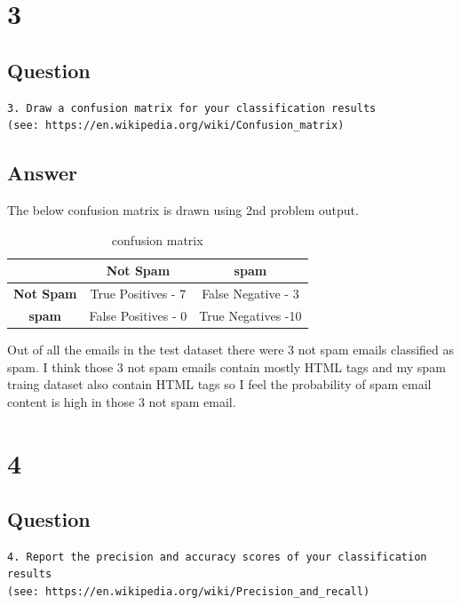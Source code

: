 \documentclass[letterpaper,11pt]{article}
\begin{document}
\section*{3}

\subsection*{Question}

\begin{verbatim}
3. Draw a confusion matrix for your classification results
(see: https://en.wikipedia.org/wiki/Confusion_matrix)
\end{verbatim}

\subsection*{Answer}

The below confusion matrix is drawn using 2nd problem output.
\begin{table}[htb]
\begin{tabular}{ | c | c | c | }
\hline
\textbf{} & \textbf{Not Spam} & \textbf{spam}  \\
\hline
\textbf{Not Spam} &True Positives - 7  & False Negative -  3 \\
\hline
\textbf{spam} &False Positives - 0 & True Negatives -10 \\
\hline
\end{tabular}
\caption{confusion matrix}
\label{table:q1user1}
\end{table}
Out of all the emails in the test dataset there were 3 not spam emails classified as spam. I think those 3 not spam emails contain mostly HTML tags and my spam traing dataset also contain HTML tags so I feel the probability of  spam email content is high in those 3 not spam email.

\clearpage


\section*{4}

\subsection*{Question}

\begin{verbatim}
4. Report the precision and accuracy scores of your classification results
(see: https://en.wikipedia.org/wiki/Precision_and_recall)
\end{verbatim}
\end{document}
